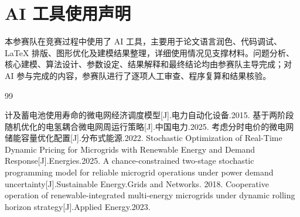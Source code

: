 %
%

\section*{AI 工具使用声明}

本参赛队在竞赛过程中使用了 AI 工具，主要用于论文语言润色、代码调试、\LaTeX{} 排版、图形优化及建模结果整理，详细使用情况见支撑材料。问题分析、核心建模、算法设计、参数设定、结果解释和最终结论均由参赛队主导完成；对 AI 参与完成的内容，参赛队进行了逐项人工审查、程序复算和结果核验。

\vspace{0.5\baselineskip}
\begin{thebibliography}{99}

计及蓄电池使用寿命的微电网经济调度模型[J].电力自动化设备.2015.
基于两阶段随机优化的电氢耦合微电网周运行策略[J].中国电力.2025.
考虑分时电价的微电网储能容量优化配置[J].分布式能源.2022.
Stochastic Optimization of Real-Time Dynamic Pricing for Microgrids with Renewable Energy and Demand Response[J].Energies.2025.
A chance-constrained two-stage stochastic programming model for reliable microgrid operations under power demand uncertainty[J].Sustainable Energy.Grids and Networks. 2018.
Cooperative operation of renewable-integrated multi-energy microgrids under dynamic rolling horizon strategy[J].Applied Energy.2023.


\end{thebibliography}
